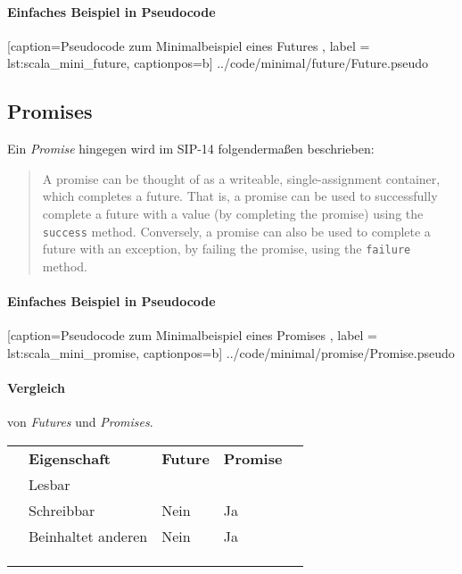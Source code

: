 

\paragraph{Einfaches Beispiel in Pseudocode}


    [caption={Pseudocode zum Minimalbeispiel eines Futures },
       label = lst:scala_mini_future,
       captionpos=b]
 {../code/minimal/future/Future.pseudo}

\subsection{Promises}

Ein \emph{Promise} hingegen wird im SIP-14 folgendermaßen beschrieben:
\begin{quote}
A promise can be thought of as a writeable, single-assignment container, which 
completes a future. That is, a promise can be used to successfully complete a 
future with a value (by \glqq completing\grqq{} the promise) using the \texttt{success} method. 
Conversely, a promise can also be used to complete a future with an exception, 
by failing the promise, using the \texttt{failure} method.
\end{quote}


\paragraph{Einfaches Beispiel in Pseudocode}


    [caption={Pseudocode zum Minimalbeispiel eines Promises },
       label = lst:scala_mini_promise,
       captionpos=b]
 {../code/minimal/promise/Promise.pseudo}

\paragraph{Vergleich} von \emph{Futures} und \emph{Promises}.

\begin{table}[h]
\begin{tabular}{lllll}
 & \textbf{Eigenschaft} & \textbf{Future} & \textbf{Promise} &  \\
 & Lesbar &  &  &  \\
 & Schreibbar & Nein & Ja &  \\
 & Beinhaltet anderen & Nein & Ja &  \\
 &  &  &  &  \\
 &  &  &  &  \\
 &  &  &  & 
\end{tabular}
\end{table}


